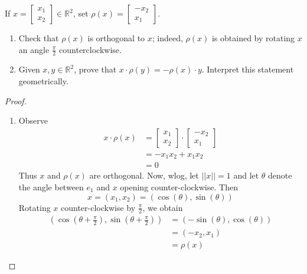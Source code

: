 \begin{exercise} \label{e1.2.16}
    If $x = \begin{bmatrix} x_1 \\ x_2 \end{bmatrix} \in \mathbb{R}^2$, set $\rho(x) = \begin{bmatrix} -x_2 \\ x_1 \end{bmatrix}$.
    
    \begin{enumerate}
        \item Check that $\rho(x)$ is orthogonal to $x$; indeed, $\rho(x)$ is obtained by rotating $x$ an angle $\frac{\pi}{2}$ counterclockwise.
        
        \item Given $x,y \in \mathbb{R}^2$, prove that $x \cdot \rho(y)=-\rho(x) \cdot y$. Interpret this statement geometrically.
    \end{enumerate}
    
    \begin{proof}
        \begin{enumerate}
            \item Observe
            \begin{align*}
                x \cdot \rho(x) &= \begin{bmatrix} x_1 \\ x_2 \end{bmatrix} \cdot \begin{bmatrix} -x_2 \\ x_1 \end{bmatrix} \\
                &= -x_1x_2 + x_1x_2 \\
                &= 0
            \end{align*}
            Thus $x$ and $\rho(x)$ are orthogonal. Now, wlog, let $\vert \vert x \vert \vert = 1$ and let $\theta$ denote the angle between $e_1$ and $x$ opening counter-clockwise. Then 
            $$ x = (x_1,x_2) = (\cos(\theta),\sin(\theta)) $$
            Rotating $x$ counter-clockwise by $\frac{\pi}{2}$, we obtain
            \begin{align*}
                \left( \cos\left( \theta + \frac{\pi}{2} \right), \sin\left( \theta + \frac{\pi}{2} \right) \right) &= (-\sin(\theta),\cos(\theta)) \\
                &= (-x_2,x_1) \\
                &= \rho(x)
            \end{align*}
            

\end{enumerate}
\end{proof}
\end{exercise}
